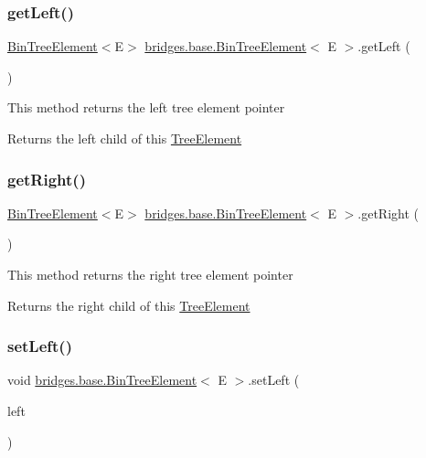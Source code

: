 \subsubsection{\texorpdfstring{get\+Left()}{getLeft()}}
{\footnotesize\ttfamily \hyperlink{classbridges_1_1base_1_1_bin_tree_element}{Bin\+Tree\+Element}$<$E$>$ \hyperlink{classbridges_1_1base_1_1_bin_tree_element}{bridges.\+base.\+Bin\+Tree\+Element}$<$ E $>$.get\+Left (\begin{DoxyParamCaption}{ }\end{DoxyParamCaption})}

This method returns the left tree element pointer \begin{DoxyReturn}{Returns}
the left child of this \hyperlink{classbridges_1_1base_1_1_tree_element}{Tree\+Element} 
\end{DoxyReturn}
\mbox{\label{classbridges_1_1base_1_1_bin_tree_element_aa3855c26617ada7248a9d4f83cf455b7}} 
\subsubsection{\texorpdfstring{get\+Right()}{getRight()}}
{\footnotesize\ttfamily \hyperlink{classbridges_1_1base_1_1_bin_tree_element}{Bin\+Tree\+Element}$<$E$>$ \hyperlink{classbridges_1_1base_1_1_bin_tree_element}{bridges.\+base.\+Bin\+Tree\+Element}$<$ E $>$.get\+Right (\begin{DoxyParamCaption}{ }\end{DoxyParamCaption})}

This method returns the right tree element pointer

\begin{DoxyReturn}{Returns}
the right child of this \hyperlink{classbridges_1_1base_1_1_tree_element}{Tree\+Element} 
\end{DoxyReturn}
\mbox{\label{classbridges_1_1base_1_1_bin_tree_element_a5bcc2c1374a49f7ab2523ce53d204c30}} 
\subsubsection{\texorpdfstring{set\+Left()}{setLeft()}}
{\footnotesize\ttfamily void \hyperlink{classbridges_1_1base_1_1_bin_tree_element}{bridges.\+base.\+Bin\+Tree\+Element}$<$ E $>$.set\+Left (\begin{DoxyParamCaption}\item[{\hyperlink{classbridges_1_1base_1_1_bin_tree_element}{Bin\+Tree\+Element}$<$ E $>$}]{left }\end{DoxyParamCaption})}

